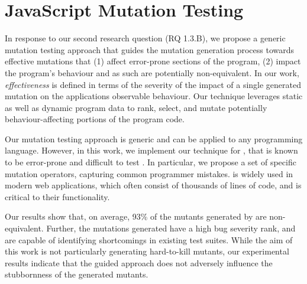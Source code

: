 \chapter{JavaScript Mutation Testing} \label{Chap:mutandis}
In response to our second research question (RQ 1.3.B), we propose a generic mutation testing approach that guides the mutation generation process towards effective mutations that (1) affect error-prone sections of the program, (2) impact the program's behaviour and as such are potentially non-equivalent. In our work, \emph{effectiveness} is defined in terms of the severity of the impact of a single generated mutation on the applications observable behaviour.  %
Our technique leverages static as well as dynamic program data to rank, select, and mutate potentially behaviour-affecting portions of the program code. %

Our mutation testing approach is generic and can be applied to any programming language. However, in this work, we implement our technique for \javascript, that is known to be error-prone \cite{Crockford:2008, Ocariza-2011} and difficult to test \cite{mesbah:tse12, artzi:icse11}. In particular, we propose a set of \javascript specific mutation operators, capturing  common  \javascript programmer mistakes. \javascript is widely used in modern web applications, which often consist of thousands of lines of \javascript code, and is critical to their functionality.

Our results show that, on average,  93\% of the mutants generated by \mutandis are non-equivalent.
Further, the mutations generated have a high bug severity rank, and are capable of
identifying shortcomings in existing \javascript test suites. 
While the aim of this work is not particularly generating hard-to-kill mutants, our experimental results indicate that the guided approach does not adversely influence the stubbornness of the generated mutants. 
%




%

